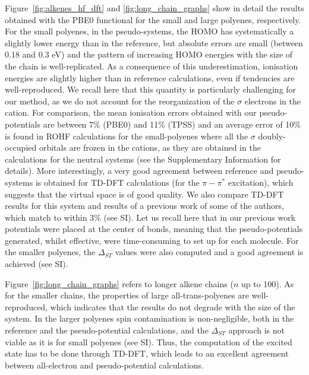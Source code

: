 \documentclass[12pt]{article}
\begin{document}
Figure~\ref{fig:alkenes_hf_dft} and \ref{fig:long_chain_graphs} show in detail the results obtained with the PBE0 functional for the small and large polyenes, respectively.
For the small polyenes, in the pseudo-systems, the HOMO has systematically a slightly lower energy than in the reference,
but absolute errors are small (between 0.18 and 0.3 eV) and the pattern of increasing HOMO energies with the size of the chain is well-replicated. As a consequence of this underestimation, 
ionisation energies are slightly higher than in reference calculations, even if tendencies are well-reproduced. 
We recall here that this quantity is particularly challenging for our method, as we do not account for
the reorganization of the $\sigma$ electrons in the cation.
For comparison, the mean ionisation errors obtained with our pseudo-potentials are between 7\% (PBE0) and 11\% (TPSS) 
and an average error of 10\% is found in ROHF calculations for the small-polyenes where all the $\sigma$ doubly-occupied 
orbitals are frozen in the cations, as they are obtained in the calculations for the neutral systems
(see the Supplementary Information for details). 
More interestingly, a very good agreement between reference and pseudo-systems is obtained for TD-DFT
calculations (for the $\pi-\pi^*$ excitation), which suggests that the virtual space is of good
quality.
We also compare TD-DFT results for this system and results of a previous work of some of the authors, which match to within 3\% (see SI).\cite{drujon_pseudopotentials_2013}
Let us recall here that in our previous work potentials were placed at the center of bonds, meaning that the pseudo-potentials generated, whilst effective, were time-consuming to set up for each molecule.
For the smaller polyenes, the $\Delta_{ST}$ values were also computed and a good agreement is achieved (see SI).

Figure~\ref{fig:long_chain_graphs} refers to longer alkene chains (\(n\) up to 100).
As for the smaller chains, the properties of large all-trans-polyenes are well-reproduced,
which indicates that the results do not degrade with the size of the system.
In the larger polyenes spin contamination is non-negligible, both in the reference and the pseudo-potential calculations, and the $\Delta_{ST}$ approach is not viable as it is for small polyenes (see SI).
Thus, the computation of the excited state has to be done through TD-DFT, which leads to an excellent agreement between all-electron and pseudo-potential calculations.
\end{document}
